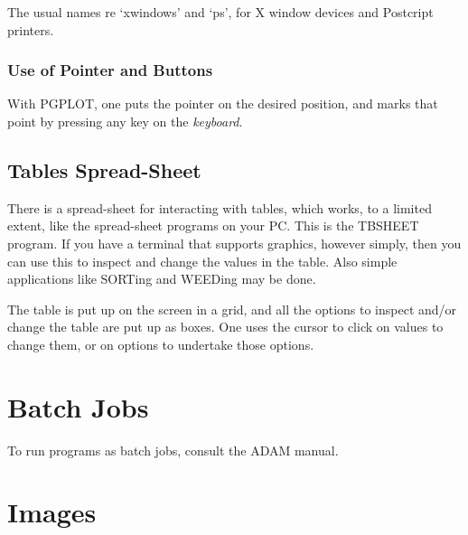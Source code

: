 The usual names re `xwindows' and `ps', for X window devices and
Postcript printers.


\subsubsection{Use of Pointer and Buttons}

With PGPLOT, one puts the pointer on the desired position, and marks
that point by pressing any key on the {\em keyboard}.

\subsection{Tables Spread-Sheet}

There is a spread-sheet for interacting with tables, which works, to a
limited extent, like the spread-sheet programs on your PC.  This is the
TBSHEET program. If you have a terminal that supports graphics, however
simply, then you can use this to inspect and change the values in the
table. Also simple applications like SORTing and WEEDing may be done.

The table is put up on the screen in a grid, and all the options to
inspect and/or change the table are put up as boxes. One uses the
cursor to click on values to change them, or on options to undertake
those options.
















\section{Batch Jobs} 

To run \starman programs as batch jobs, consult the ADAM manual.




















\section{Images} 



